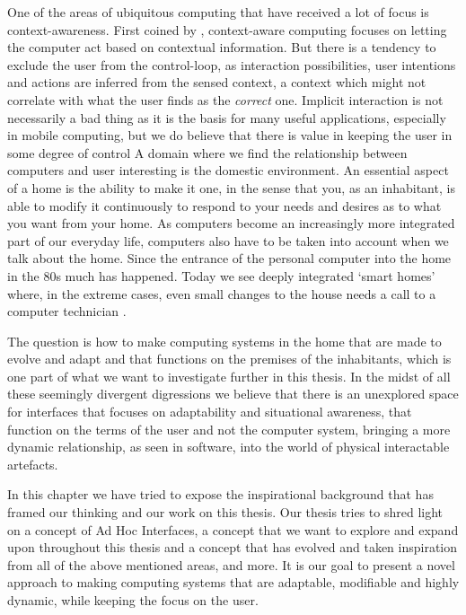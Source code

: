 One of the areas of ubiquitous computing that have received a lot of focus is context-awareness.
First coined by \citet{schilit1994context}, context-aware computing focuses on letting the computer act based on contextual information.
But there is a tendency to exclude the user from the control-loop, as interaction possibilities, user intentions and actions are inferred from the sensed context, a context which might not correlate with what the user finds as the \emph{correct} one.
Implicit interaction is not necessarily a bad thing as it is the basis for many useful applications, especially in mobile computing, but we do believe that there is value in keeping the user in some degree of control
\blank
A domain where we find the relationship between computers and user interesting is the domestic environment.
An essential aspect of a home is the ability to make it one, in the sense that you, as an inhabitant, is able to modify it continuously to respond to your needs and desires as to what you want from your home.
As computers become an increasingly more integrated part of our everyday life, computers also have to be taken into account when we talk about the home.
Since the entrance of the personal computer into the home in the 80s much has happened.
Today we see deeply integrated `smart homes' where, in the extreme cases, even small changes to the house needs a call to a computer technician .

The question is how to make computing systems in the home that are made to evolve and adapt and that functions on the premises of the inhabitants, which is one part of what we want to investigate further in this thesis.  
\blank
In the midst of all these seemingly divergent digressions we believe that there is an unexplored space for interfaces that focuses on adaptability and situational awareness, that function on the terms of the user and not the computer system, bringing a more dynamic relationship, as seen in software, into the world of physical interactable artefacts.

In this chapter we have tried to expose the inspirational background that has framed our thinking and our work on this thesis.
Our thesis tries to shred light on a concept of Ad Hoc Interfaces, a concept that we want to explore and expand upon throughout this thesis and a concept that has evolved and taken inspiration from all of the above mentioned areas, and more. 
It is our goal to present a novel approach to making computing systems that are adaptable, modifiable and highly dynamic, while keeping the focus on the user. 